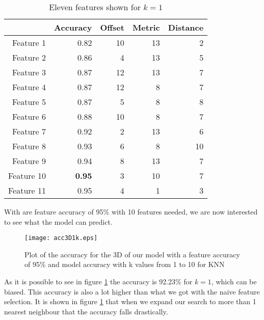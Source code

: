 \begin{table}[H]
  \centering
    \begin{tabular}{|r|r|r|r|r|}
    \hline
          & Accuracy & Offset & Metric & Distance \\
    \hline
    Feature 1 & 0.82  & 10    & 13    & 2 \\
    \hline
    Feature 2 & 0.86  & 4     & 13    & 5 \\
    \hline
    Feature 3 & 0.87  & 12    & 13    & 7 \\
    \hline
    Feature 4 & 0.87  & 12    & 8     & 7 \\
    \hline
    Feature 5 & 0.87  & 5     & 8     & 8 \\
    \hline
    Feature 6 & 0.88  & 10    & 8     & 7 \\
    \hline
    Feature 7 & 0.92  & 2     & 13    & 6 \\
    \hline
    Feature 8 & 0.93  & 6     & 8     & 10 \\
    \hline
    Feature 9 & 0.94  & 8     & 13    & 7 \\
    \hline
    Feature 10 & \textbf{0.95}  & 3     & 10    & 7 \\
    \hline
    Feature 11 & 0.95  & 4     & 1     & 3 \\
    \hline
    \end{tabular}%
  \caption{Eleven features shown for $k=1$}\label{tab:Features3d1k}%
\end{table}%

With are feature accuracy of 95\% with 10 features needed, we are now interested to see what the model can predict.

\begin{figure}[H]
  \centering
  \texttt{[image: acc3D1k.eps]}
  \caption{Plot of the accuracy for the 3D of our model with a feature accuracy of 95\% and model accuracy with k values from 1 to 10 for KNN}\label{fig:Features3d1k}
\end{figure}

As it is possible to see in figure \ref{fig:Features3d1k} the accuracy is 92.23\% for $k=1$, which can be biased. This accuracy is also a lot higher than what we got with the naive feature selection. It is shown in figure \ref{fig:Features3d1k} that when we expand our search to more than 1 nearest neighbour that the accuracy falls drastically.

